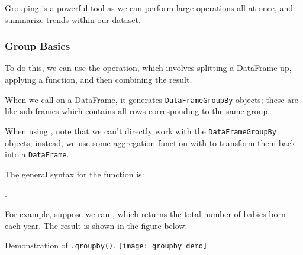\documentclass[openany]{book}
\begin{document}
Grouping is a powerful tool as we can perform large operations all at once, and summarize trends within our dataset.

\subsubsection{Group Basics}
To do this, we can use the  operation, which involves splitting a DataFrame up, applying a function, and then combining the result.

When we call  on a DataFrame, it generates \texttt{DataFrameGroupBy} objects; these are like sub-frames which contains all rows corresponding to the same group.

When using , note that we can't directly work with the \texttt{DataFrameGroupBy} objects; instead, we use some aggregation function with  to transform them back into a \texttt{DataFrame}.

The general syntax for the  function is:
\begin{center}
	.
\end{center}

For example, suppose we ran , which returns the total number of babies born each year. The result is shown in the figure below:

\begin{figurebox}{Demonstration of \texttt{.groupby()}.}
	\centering\texttt{[image: groupby\_demo]}
\end{figurebox}
\end{document}
